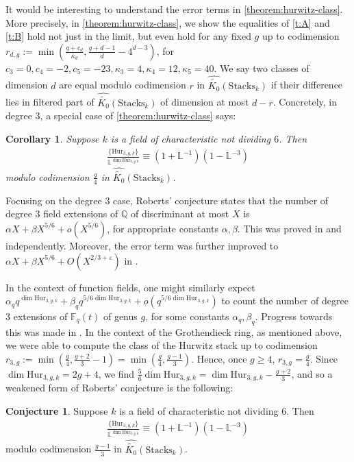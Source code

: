 \documentclass[12 pt]{amsart}
\theoremstyle{plain}
\newtheorem{corollary}[theorem]{Corollary}
\theoremstyle{definition}
\newtheorem{conjecture}[theorem]{Conjecture}
\theoremstyle{remark}
\numberwithin{equation}{section}
\newcommand\bl{\mathbb L}
\newcommand\hur[3]{\mathrm{Hur}_{#1,#2,#3}} %
\newcommand\codimbound[2]{r_{#1,#2}} %
\newcommand\grcSpaces{\widehat{\widetilde{K_0}}(\mathrm{Spaces}_k)} %
\newcommand\grcStacks{\widehat{\widetilde{K_0}}(\mathrm{Stacks}_k)} %
\DeclareMathOperator\chr{\operatorname{char}}
\begin{document}
It would be interesting to understand the error terms in
\autoref{theorem:hurwitz-class}.
More precisely, in \autoref{theorem:hurwitz-class}, we show the equalities of 
\autoref{t:A} and \autoref{t:B} hold not just in the limit, but even hold for
any fixed $g$ up to codimension 
$\codimbound d g := \min(\frac{g + c_d}{\kappa_d}, \frac{g +
d-1}{d} - 4^{d-3})$,
for $c_3 = 0, c_4=-2, c_5 = -23, \kappa_3 = 4, \kappa_4 = 12, \kappa_5 = 40$. 
We say two classes of dimension $d$ are equal modulo codimension $r$ in 
$\grcStacks$ if their difference lies in filtered part of 
$\grcStacks$ of dimension at most $d - r$.
Concretely, in degree $3$, a special case of
\autoref{theorem:hurwitz-class} says:
\begin{corollary}
	\label{corollary:}
	Suppose $k$ is a
	field of
	characteristic not dividing $6$. 
	Then
	\begin{align*}
	\frac{\{\hur 3 g k\}} {\bl^{ \dim \hur 3 g k}} \equiv
(1+\bl^{-1})\left( 1 - \bl^{-3} \right)
	\end{align*}
	modulo codimension 
	$\frac{g}{4}$ in
	$\grcStacks$. 
\end{corollary}

Focusing on the degree $3$ case, Roberts' conjecture \cite{Roberts2001}
states that the number of degree $3$ field extensions of $\mathbb Q$
of discriminant at most $X$ is $\alpha X + \beta X^{5/6} +
o(X^{5/6})$, for appropriate constants $\alpha, \beta$.
This was proved in \cite{Bhargava2013b} and \cite{Taniguchi2013} independently.
Moreover, the error term was further improved to
$\alpha X + \beta X^{5/6} + O(X^{2/3+\varepsilon})$
in \cite{bhargavaTT:improved-error}.

In the context of function fields, one might similarly expect
$\alpha_q q^{\dim \hur 3 g k} + \beta_q q^{5/6 \dim \hur 3 g k} + o(q^{5/6 \dim \hur
3 g k})$ to count the number of degree 3 extensions of $\mathbb F_q(t)$ of genus $g$, for some constants $\alpha_q,\beta_q$.
Progress towards this was made in 
\cite{zhao:on-sieve-methods-for-varieties-over-finite-fields}.
In the context of the Grothendieck ring, 
as mentioned above, we were able to compute the class of the Hurwitz stack up to
codimension $\codimbound 3 g := \min(\frac{g}{4}, \frac{g + 2}{3}-1) =
\min(\frac{g}{4}, \frac{g-1}{3})$.
Hence, once $g \geq 4$, $\codimbound 3 g  = \frac{g}{4}$.
Since $\dim \hur 3 g k = 2g + 4$, we find
$\frac{5}{6} \dim \hur 3 g k = \dim \hur 3 g k  - \frac{g + 2}{3}$,
and so a weakened form of Roberts' conjecture
is the following:
\begin{conjecture}
	\label{conjecture:second-order}
Suppose $k$ is a
	field of
	characteristic not dividing $6$. 
	Then
	\begin{align*}
	\frac{\{\hur 3 g k\}} {\bl^{ \dim \hur 3 g k}} \equiv
(1+\bl^{-1})\left( 1 - \bl^{-3} \right)
	\end{align*}
	modulo codimension 
	$\frac{g-1}{3}$ in
	$\grcStacks$. 
\end{conjecture}
\end{document}

